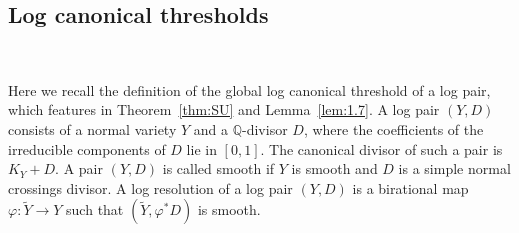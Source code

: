 \documentclass{amsart}
\theoremstyle{definition}
\newcommand{\QQ}{\mathbb{Q}}
\begin{document}
\subsection{Log canonical thresholds} \

Here we recall the definition of the global log canonical threshold of a log pair, which features in Theorem~\ref{thm:SU} and Lemma~\ref{lem:1.7}. A log pair \((Y,D)\) consists of a normal variety \(Y\) and a \(\QQ\)-divisor \(D\), where the coefficients of the irreducible components of \(D\) lie in \([0,1]\). The canonical divisor of such a pair is \(K_Y+D\). A pair \((Y,D)\) is called smooth if \(Y\) is smooth and \(D\) is a simple normal crossings divisor. A log resolution of a log pair \((Y,D)\) is a birational map \(\varphi: \tilde{Y} \to Y\) such that \((\tilde{Y},\varphi^*D)\) is smooth.
\end{document}
